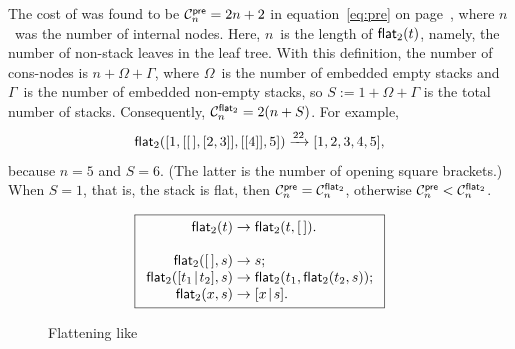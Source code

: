 The cost of  was found to be
\(\C{\fun{pre}}{n} = 2n+2\) in
equation~\eqref{eq:pre} on page~\pageref{eq:pre}, where \(n\)~was the
number of internal nodes. Here, \(n\)~is the length of
\(\fun{flat}_2(t)\), namely, the number
of non\hyp{}stack leaves in the leaf tree. With this definition, the
number of cons\hyp{}nodes is \(n + \Omega + \Gamma\), where
\(\Omega\)~is the number of embedded empty stacks and \(\Gamma\)~is
the number of embedded non\hyp{}empty stacks, so \(S := 1 + \Omega +
\Gamma\) is the total number of stacks. Consequently,
\(\C{\fun{flat}_2}{n} = 2(n + S)\).
For example,
\begin{equation*}
\fun{flat}_2([1,[\el,[2,3]],[[4]],5]) \xrightarrow{22} [1,2,3,4,5],
\end{equation*}
because \(n=5\) and \(S=6\). (The latter is the number of opening
square brackets.) When \(S=1\), that is, the stack is flat, then
\(\C{\fun{pre}}{n} = \C{\fun{flat}_2}{n}\), otherwise
\(\C{\fun{pre}}{n} < \C{\fun{flat}_2}{n}\).

\begin{figure}[t]
\begin{equation*}
\boxed{
\begin{array}{r@{\;}c@{\;}l}
\fun{flat}_2(t) & \rightarrow & \fun{flat}_2(t,\el).\\
\\
\fun{flat}_2(\el,s) & \rightarrow & s;\\
\fun{flat}_2(\cons{t_1}{t_2},s)
  & \rightarrow & \fun{flat}_2(t_1,\fun{flat}_2(t_2,s));\\
\fun{flat}_2(x,s) & \rightarrow & \cons{x}{s}.
\end{array}}
\end{equation*}
\caption{Flattening like }
\label{fig:flat2}
\end{figure}

\label{inorder}

